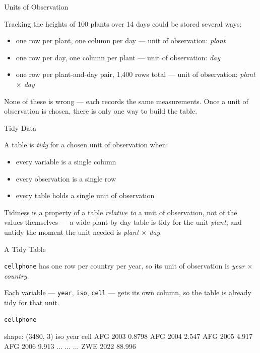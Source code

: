\documentclass[8pt,aspectratio=169]{beamer}
\begin{document}
\begin{textframe}{Units of Observation}

Tracking the heights of 100 plants over 14 days could be stored several ways:

\begin{itemize}
\item one row per plant, one column per day --- unit of observation: \textit{plant}
\item one row per day, one column per plant --- unit of observation: \textit{day}
\item one row per plant-and-day pair, 1{,}400 rows total --- unit of observation: \textit{plant $\times$ day}
\end{itemize}

None of these is wrong --- each records the same measurements. Once a unit of observation is chosen, there is only one way to build the table.

\end{textframe}

\begin{textframe}{Tidy Data}

A table is \textit{tidy} for a chosen unit of observation when:

\begin{itemize}
\item every variable is a single column
\item every observation is a single row
\item every table holds a single unit of observation
\end{itemize}

Tidiness is a property of a table \textit{relative to} a unit of observation, not of the values themselves --- a wide plant-by-day table is tidy for the unit \textit{plant}, and untidy the moment the unit needed is \textit{plant $\times$ day}.

\end{textframe}

\begin{frame}[fragile]{A Tidy Table}
\begin{splitcode}{%

\texttt{cellphone} has one row per country per year, so its unit of observation is \textit{year $\times$ country}.

Each variable --- \texttt{year}, \texttt{iso}, \texttt{cell} --- gets its own column, so the table is already tidy for that unit.

}
\begin{lstlisting}[language=Python]
cellphone
\end{lstlisting}
\begin{codeoutput}
shape: (3480, 3)
iso  year  cell
AFG  2003  0.8798
AFG  2004  2.547
AFG  2005  4.917
AFG  2006  9.913
...  ...   ...
ZWE  2022  88.996
\end{codeoutput}
\end{splitcode}
\end{frame}
\end{document}
